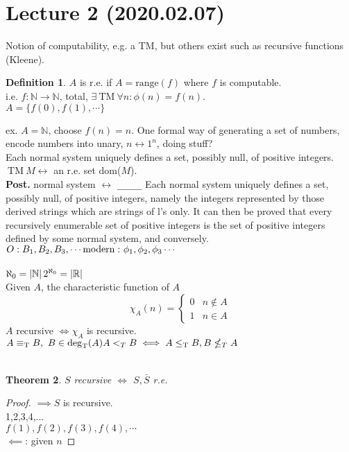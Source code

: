\documentclass{article}
\let\ddd\cdots
\newcommand{\R}{\mathbb{R}}
\newcommand{\N}{\mathbb{N}}
\newcommand{\abs}[1]{\left|#1\right|}
\newcommand{\tm}{\ \mathrm{TM}\ }
\newcommand{\tr}{\leq_\mathrm{T}}
\newcommand{\tdeg}{\deg_\mathrm{T}}
\newcommand{\teq}{\equiv_\mathrm{T}}
\newtheorem{theorem}{Theorem}[section]
\theoremstyle{definition}
\newtheorem{definition}[theorem]{Definition}
\theoremstyle{remark}
\theoremstyle{example}
\begin{document}
	\section*{Lecture 2 (2020.02.07)}
	Notion of computability, e.g. a TM, but others exist such as recursive functions (Kleene).
	\begin{definition}
		$A$ is r.e. if $A=\mathrm{range}(f)$ where $f$ is computable.\\
		i.e. $f:\N \to \N$, total, $\exists \tm \forall n : \phi(n)=f(n)$.\\
		$A=\{f(0),f(1),\ddd\}$
	\end{definition}
	ex. $A=\N$, choose $f(n)=n$.
	One formal way of generating a set of numbers, encode numbers into unary, $n \leftrightarrow 1^n$, doing stuff?\\
	Each normal system uniquely defines a set, possibly null,
	of positive integers.\\
	$\tm M \leftrightarrow$ an r.e. set dom($M$).\\
	\textbf{Post.} normal system $\leftrightarrow$ \verb|_____|
	 Each normal system uniquely defines a set, possibly null,
	of positive integers, namely the integers represented by those derived
	strings which are strings of l's only. It can then be proved that every
	recursively enumerable set of positive integers is the set of positive
	integers defined by some normal system, and conversely.\\
	$O:B_1,B_2,B_3,\ddd\\
	\mathrm{modern:}\ \phi_1,\phi_2, \phi_3 \ddd$\\
	\\
	$\aleph_0 = \abs{\N}\\
	2^{\aleph_0}=\abs{\R}$\\
	Given $A$, the characteristic function of $A$
	\[\chi_A(n)=\begin{cases}
		0 & n \notin A\\
		1 & n \in A
	\end{cases}\]
	$A$ recursive $\iff \chi_A$ is recursive.\\
	$A \teq B,\ B \in \tdeg(A)\\
	A <_T B \iff A \tr B, B \nleq_T A$\\
	\\
	
	\begin{theorem}
		$S$ recursive $\iff$ $S, \bar{S}$ r.e.
	\end{theorem}
	\begin{proof}
		$\implies S$ is recursive.\\
		1,2,3,4,...\\
		$f(1),f(2),f(3),f(4),\ddd$\\
		$\impliedby$: given $n$
	\end{proof}
\end{document}
